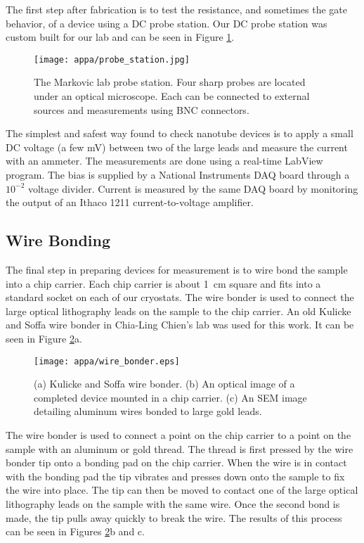 The first step after fabrication is to test the resistance, and sometimes the gate behavior, of a device using a DC probe station. Our DC probe station was custom built for our lab and can be seen in Figure \ref{fig:probe_station}.

\begin{figure}
	\centering
	\texttt{[image: appa/probe\_station.jpg]}
	\caption{The Markovic lab probe station. Four sharp probes are located under an optical microscope. Each can be connected to external sources and measurements using BNC connectors.}
	\label{fig:probe_station}
\end{figure}

The simplest and safest way found to check nanotube devices is to apply a small DC voltage (a few \si{\milli\volt}) between two of the large leads and measure the current with an ammeter. The measurements are done using a real-time LabView program. The bias is supplied by a National Instruments DAQ board through a $10^{-2}$ voltage divider. Current is measured by the same DAQ board by monitoring the output of an Ithaco 1211 current-to-voltage amplifier. 

\subsection{Wire Bonding}
\label{subsec:wire_bonding}

The final step in preparing devices for measurement is to wire bond the sample into a chip carrier. Each chip carrier is about \SI{1}{\centi\meter} square and fits into a standard socket on each of our cryostats. The wire bonder is used to connect the large optical lithography leads on the sample to the chip carrier. An old Kulicke and Soffa wire bonder in Chia-Ling Chien's lab was used for this work. It can be seen in Figure \ref{fig:wire_bonder}a.

\begin{figure}
	\centering
	\texttt{[image: appa/wire\_bonder.eps]}
	\caption{(a) Kulicke and Soffa wire bonder. (b) An optical image of a completed device mounted in a chip carrier. (c) An SEM image detailing aluminum wires bonded to large gold leads.}
	\label{fig:wire_bonder}
\end{figure}

The wire bonder is used to connect a point on the chip carrier to a point on the sample with an aluminum or gold thread. The thread is first pressed by the wire bonder tip onto a bonding pad on the chip carrier. When the wire is in contact with the bonding pad the tip vibrates and presses down onto the sample to fix the wire into place. The tip can then be moved to contact one of the large optical lithography leads on the sample with the same wire. Once the second bond is made, the tip pulls away quickly to break the wire. The results of this process can be seen in Figures \ref{fig:wire_bonder}b and c.
